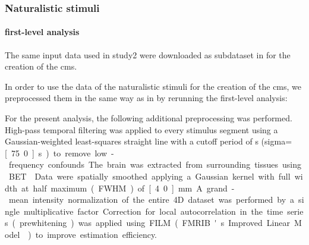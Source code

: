 \subsubsection{Naturalistic stimuli}



\paragraph{first-level analysis}


The same input data used in study2 were downloaded as subdataset in
\citep{haeusler2021ppadata} for the creation of the \ac{cms}.

%
In order to use the data of the naturalistic stimuli for the creation of the
\ac{cms}, we preprocessed them in the same way as in
\citep{haeusler2022processing} by rerunning the first-level analysis:


For the present analysis, the following additional preprocessing was performed.
High-pass temporal filtering was applied to every stimulus segment using a
Gaussian-weighted least-squares straight line with a cutoff period of
\unit[150]{s} (sigma=\unit[75.0]{s}) to remove low-frequency confounds.
The brain was extracted from surrounding tissues using BET \citep{smith2002bet}.
Data were spatially smoothed applying a Gaussian kernel with full width at half
maximum (FWHM) of \unit[4.0]{mm}.
A grand-mean intensity normalization of the entire 4D dataset was performed by a
single multiplicative factor.
Correction for local autocorrelation in the time series (prewhitening) was
applied using FILM (FMRIB's Improved Linear Model \citep{woolrich2001autocorr})
to improve estimation efficiency.


